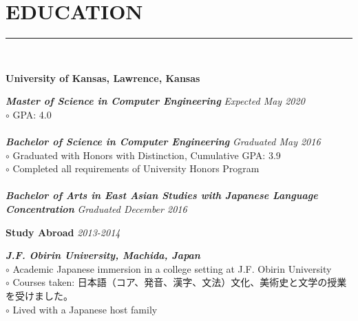 \documentclass[twoside]{article}
\begin{document}
\section*{EDUCATION}
\vspace{-1em}
\rule{\textwidth}{1pt}\\
\begin{adjustwidth}{0.2in}{0in}
\vspace{-1em}
\textbf{University of Kansas, Lawrence, Kansas}\\
\end{adjustwidth}
\begin{adjustwidth}{0.4in}{0in}
\vspace{-1em}
\textbf{\emph{Master of Science in Computer Engineering}} \hfill \textit{Expected May 2020}\\
$\circ$ GPA: 4.0\\\\
\textbf{\emph{Bachelor of Science in Computer Engineering}} \hfill \textit{Graduated May 2016}\\
$\circ$ Graduated with Honors with Distinction, Cumulative GPA: 3.9\\
$\circ$ Completed all requirements of University Honors Program\\\\
\textbf{\emph{Bachelor of Arts in East Asian Studies with Japanese Language Concentration}} \hfill \textit{Graduated December 2016}\\
\end{adjustwidth}
\begin{adjustwidth}{0.2in}{0in}
\textbf{Study Abroad} \hfill \textit{2013-2014}\\
\end{adjustwidth}
\vspace{-1em}
\begin{adjustwidth}{0.4in}{0in}
\textbf{\emph{J.F. Obirin University, Machida, Japan}}\\
$\circ$ Academic Japanese immersion in a college setting at J.F. Obirin University\\
$\circ$ Courses taken: 日本語（コア、発音、漢字、文法）文化、美術史と文学の授業を受けました。\\
$\circ$ Lived with a Japanese host family\\
\end{adjustwidth}
\end{document}
